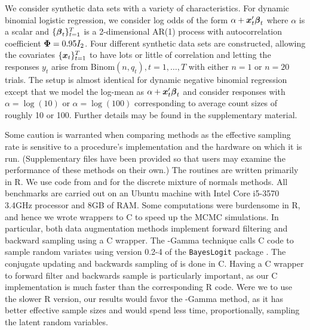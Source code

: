 We consider synthetic data sets with a variety of characteristics.
For dynamic binomial logistic regression, we consider log odds of the form
$\alpha + \boldsymbol{x}_t' \boldsymbol{\beta}_t$ where $\alpha$ is a scalar and $\{\boldsymbol{\beta}_t\}_{t=1}^T$
is a 2-dimensional AR(1) process with autocorrelation coefficient $\boldsymbol{\Phi} = 0.95
I_2$.  Four different synthetic data sets are constructed, allowing the
covariates $\{\boldsymbol{x}_t\}_{t=1}^T$ to have lots or little of correlation and letting
the responses $y_t$ arise from $\text{Binom}(n, q_t), t=1, \ldots, T$ with
either $n=1$ or $n=20$ trials.  The setup is almost identical for dynamic
negative binomial regression except that we model the log-mean as $\alpha +
\boldsymbol{x}_t' \boldsymbol{\beta}_t$ and consider responses with $\alpha = \log(10)$ or $\alpha =
\log(100)$ corresponding to average count sizes of roughly 10 or 100.  Further
details may be found in the supplementary material.

Some caution is warranted when comparing methods as the effective sampling rate
is sensitive to a procedure's implementation and the hardware on which it is
run.  (Supplementary files have been provided so that users may examine the
performance of these methods on their own.)  The routines are written primarily
in R.  We use code from \citet{binomlogit-2012} and
\citet{fruhwirth-schnatter-book-2007} for the discrete mixture of normals
methods.  All benchmarks are carried out on an Ubuntu machine with Intel Core
i5-3570 3.4GHz processor and 8GB of RAM.  Some computations were burdensome in
R, and hence we wrote wrappers to C to speed up the MCMC simulations.  In
particular, both data augmentation methods implement forward filtering and
backward sampling using a C wrapper.  The \Polya-Gamma technique calls C code to
sample random variates using version 0.2-4 of the \texttt{BayesLogit} package
\citep{bayeslogit-2013}.  The conjugate updating and backwards sampling of
\citet{migon-etal-2013} is done in C.  Having a C wrapper to forward filter and
backwards sample is particularly important, as our C implementation is much
faster than the corresponding R code.  Were we to use the slower R version, our
results would favor the \Polya-Gamma method, as it has better effective sample
sizes and would spend less time, proportionally, sampling the latent random
variables.

